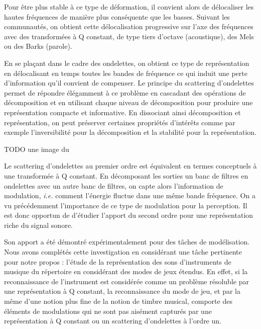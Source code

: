 Pour être plus stable à ce type de déformation, il convient alors de \og délocaliser \fg les hautes fréquences de manière plus conséquente que les basses. Suivant les communautés, on obtient cette délocalisation progressive sur l'axe des fréquences avec des transformées à Q constant, de type tiers d'octave (acoustique), des Mels ou des Barks (parole).

En se plaçant dans le cadre des ondelettes, on obtient ce type de représentation en délocalisant en temps toutes les bandes de fréquence ce qui induit une perte d'information qu'il convient de compenser. Le principe du scattering d'ondelettes permet de répondre élégamment à ce problème en cascadant des opérations de décomposition et en utilisant chaque niveau de décomposition pour produire une représentation compacte et informative. En dissociant ainsi décomposition et représentation, on peut préserver certaines propriétés d'intérêts comme par exemple l'inversibilité pour la décomposition et la stabilité pour la représentation.

TODO une image du

Le scattering d'ondelettes au premier ordre est équivalent en termes conceptuels à une transformée à Q constant. En décomposant les sorties un banc de filtres en ondelettes avec un autre banc de filtres, on capte alors l'information de modulation, \textit{i.e.} comment l'énergie fluctue dans une même bande fréquence. On a vu précédemment l'importance de ce type de modulation pour la perception. Il est donc opportun de d'étudier l'apport du second ordre pour une représentation riche du signal sonore.%

Son apport a été démontré expérimentalement pour des tâches de modélisation\cite{anden2014deep}. Nous avons complétés cette investigation en considérant une tâche pertinente pour notre propos : l'étude de la représentation des sons d'instruments de musique du répertoire en considérant des modes de jeux étendus. En effet, si la reconnaissance de l'instrument est considérée comme un problème résoluble par une représentation à Q constant, la reconnaissance du mode de jeu, et par la même d'une notion plus fine de la notion de timbre musical, comporte des éléments de modulations qui ne sont pas aisément capturés par une représentation à Q constant ou un scattering d'ondelettes à l'ordre un\cite{lostanlen2018extended}.

